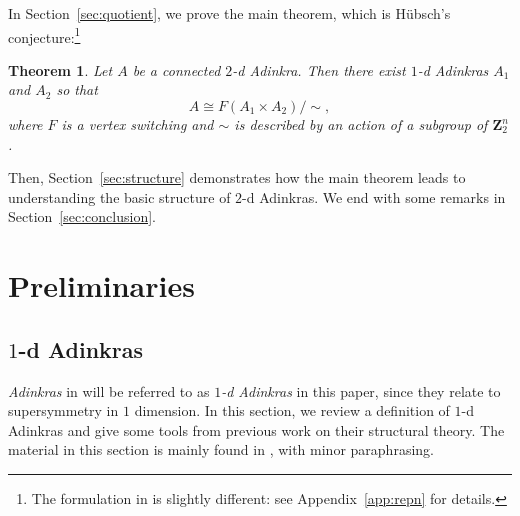 \documentclass[12pt,twoside,singlespace]{article}
\numberwithin{equation}{section}
\newtheorem{thm}[equation]{Theorem}
\theoremstyle{definition}
\newcommand{\ZZ}{\mathbf{Z}}
\begin{document}
In Section~\ref{sec:quotient}, we prove the main theorem, which is H\"ubsch's conjecture:\footnote{The formulation in \cite{hubsch:weaving} is slightly different: see Appendix~\ref{app:repn} for details.}

\begin{thm}
\label{thm:main}
Let $A$ be a connected $2$-d Adinkra.  Then there exist $1$-d Adinkras $A_1$ and $A_2$ so that
\[A\cong F(A_1\times A_2)/\sim, \]
where $F$ is a vertex switching and  $\sim$ is described by an action of a subgroup of $\ZZ_2^n$.
\end{thm}
Then, Section~\ref{sec:structure} demonstrates how the main theorem leads to understanding the basic structure of $2$-d Adinkras. We end with some remarks in Section~\ref{sec:conclusion}.

\section{Preliminaries}
\label{sec:prelim}

\subsection{$1$-d Adinkras}
\label{sec:1d}
\emph{Adinkras} in \cite{d2l:first,d2l:graph-theoretic,zhang:adinkras} will be referred to as \emph{$1$-d Adinkras} in this paper, since they relate to supersymmetry in $1$ dimension. In this section, we  review a definition of $1$-d Adinkras and give some tools from previous work on their structural theory. The material in this section is mainly found in \cite{d2l:omni,zhang:adinkras}, with minor paraphrasing. 
\end{document}
